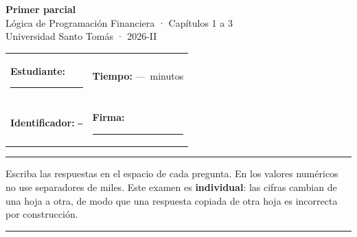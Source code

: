 \documentclass[a4paper,11pt]{article}
\newcommand{\LPFnombre}{\rule{6cm}{0.4pt}}
\newcommand{\LPFsid}{---}
\newcommand{\LPFminutos}{---}
\begin{document}
\begin{center}
  {\large\bfseries Primer parcial}\\[2pt]
  {\normalsize Lógica de Programación Financiera · Capítulos 1 a 3}\\[2pt]
  {\small Universidad Santo Tomás · 2026-II}
\end{center}

\vspace{0.4em}
\noindent\begin{tabular}{@{}p{}p{}@{}}
\textbf{Estudiante:} \LPFnombre & \textbf{Tiempo:} \LPFminutos\ minutos \\[4pt]
\textbf{Identificador:} \texttt{\LPFsid} & \textbf{Firma:} \rule{3.5cm}{0.4pt} \\
\end{tabular}

\vspace{0.6em}
\noindent\rule{\textwidth}{0.4pt}

\small\noindent
Escriba las respuestas en el espacio de cada pregunta. En los valores numéricos
no use separadores de miles. Este examen es \textbf{individual}: las cifras
cambian de una hoja a otra, de modo que una respuesta copiada de otra hoja es
incorrecta por construcción.

\vspace{0.4em}
\noindent\rule{\textwidth}{0.4pt}
\vspace{0.5em}

\begin{enumerate}
\end{enumerate}
\end{document}
